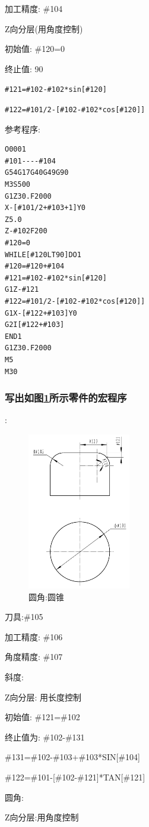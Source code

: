 加工精度: \#104

Z向分层(用角度控制)

初始值: \#120=0

终止值: 90

\verb|#121=#102-#102*sin[#120]|

\verb|#122=#101/2-[#102-#102*cos[#120]]|

参考程序:
\begin{lstlisting}
O0001
#101----#104
G54G17G40G49G90
M3S500
G1Z30.F2000
X-[#101/2+#103+1]Y0
Z5.0
Z-#102F200
#120=0
WHILE[#120LT90]DO1
#120=#120+#104
#121=#102-#102*sin[#120]
G1Z-#121
#122=#101/2-[#102-#102*cos[#120]]
G1X-[#122+#103]Y0
G2I[#122+#103]
END1
G1Z30.F2000
M5
M30
\end{lstlisting}
\subsubsection{写出如图\ref{圆角:圆锥}所示零件的宏程序}:
\begin{figure}[!hbtp]
	\centering	\includegraphics[width=0.4\textwidth]{images/13-2.jpg}
	\caption{圆角:圆锥} \label{圆角:圆锥}
\end{figure}
刀具:\#105

加工精度: \#106

角度精度: \#107

斜度:

Z向分层: 用长度控制

初始值: \#121=\#102

终止值为: \#102-\#131

\#131=\#102-\#103+\#103*SIN[\#104]

\#122=\#101-[\#102-\#121]*TAN[\#121]

圆角:

Z向分层:用角度控制

